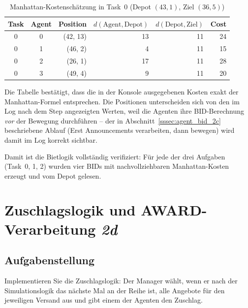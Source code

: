 \begin{table}[H]
    \centering
    \begin{tabular}{c c r r r r}
        \toprule
        \textbf{Task} & \textbf{Agent} & \textbf{Position} & \(d(\text{Agent},\text{Depot})\) & \(d(\text{Depot},\text{Ziel})\) & \textbf{Cost} \\
        \midrule
        0 & 0 & (42, 13) & 13 & 11 & 24 \\
        0 & 1 & (46,  2) &  4 & 11 & 15 \\
        0 & 2 & (26,  1) & 17 & 11 & 28 \\
        0 & 3 & (49,  4) &  9 & 11 & 20 \\
        \bottomrule
    \end{tabular}
    \caption{Manhattan-Kostenschätzung in Task~0 (Depot \((43,1)\), Ziel \((36,5)\))}
    \label{tab:kosten_2c}
\end{table}

Die Tabelle bestätigt, dass die in der Konsole ausgegebenen Kosten exakt der Manhattan-Formel entsprechen. Die Positionen unterscheiden sich von den im Log nach dem Step angezeigten Werten, weil die Agenten ihre BID-Berechnung \textit{vor} der Bewegung durchführen -- der in Abschnitt~\ref{sssec:agent_bid_2c} beschriebene Ablauf (Erst Announcements verarbeiten, dann bewegen) wird damit im Log korrekt sichtbar.

Damit ist die Bietlogik vollständig verifiziert: Für jede der drei Aufgaben (Task~0, 1, 2) wurden vier BIDs mit nachvollziehbaren Manhattan-Kosten erzeugt und vom Depot gelesen.


\section{Zuschlagslogik und AWARD-Verarbeitung \textit{2d}}
\label{sec:aufgabe2d}

\subsection{Aufgabenstellung}

Implementieren Sie die Zuschlagslogik: Der Manager wählt, wenn er nach der Simulationslogik das nächste Mal an der Reihe ist, alle Angebote für den jeweiligen Versand aus und gibt einem der Agenten den Zuschlag.

